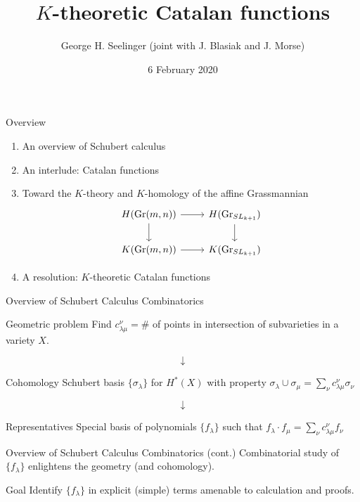 \documentclass{beamer}
\title[\(K\)-theory Catalans]{\(K\)-theoretic Catalan functions} %
\author[George H. Seelinger]{George H. Seelinger (joint with
  J. Blasiak and J. Morse)} %
\institute[UVA] %
{
CAGE \\ %
\medskip
\textit{ghs9ae@virginia.edu} %
}
\date{6 February 2020} %
\DeclareMathOperator{\Gr}{Gr}
\newcommand{\cupprod}{\cup}
\begin{document}
\begin{frame}
\titlepage %
\end{frame}
\begin{frame}[fragile]{Overview}
  \begin{enumerate}
  \item An overview of Schubert calculus
  \item An interlude: Catalan functions
  \item Toward the \(K\)-theory and \(K\)-homology of the affine
    Grassmannian
    \[
      \begin{tikzcd}
        H(\Gr(m,n)) \ar[d] \ar[r]& H(\Gr_{SL_{k+1}}) \ar[d] \\
        K(\Gr(m,n)) \ar[r] & K(\Gr_{SL_{k+1}})
      \end{tikzcd}
    \]
  \item A resolution: \(K\)-theoretic Catalan functions
  \end{enumerate}
\end{frame}
\begin{frame}{Overview of Schubert Calculus Combinatorics}
  \begin{block}{Geometric problem}
    Find \(c_{\lambda \mu}^\nu = \#\) of points in
    intersection of subvarieties in a variety \(X\). %
  \end{block}
  \[
    \downarrow
  \]
  \begin{block}{Cohomology}
    Schubert basis \(\{\sigma_\lambda\}\) for \(H^*(X)\) with property \(\sigma_\lambda \cupprod \sigma_\mu = \sum_\nu c_{\lambda \mu}^\nu \sigma_\nu\) %
\end{block}
\[
  \downarrow
\]
\begin{block}{Representatives}
  Special basis of polynomials \(\{f_\lambda\}\) such that \(f_\lambda \cdot f_\mu = \sum_\nu c_{\lambda \mu}^\nu f_\nu\)
\end{block}
\end{frame}
\begin{frame}{Overview of Schubert Calculus Combinatorics (cont.)}
  Combinatorial study of \(\{f_\lambda\}\) enlightens the geometry
  (and cohomology). %
  \begin{alertblock}{Goal}
    Identify \(\{f_\lambda\}\) in explicit (simple) terms amenable to
    calculation and proofs.
  \end{alertblock}
\end{frame}
\end{document}

